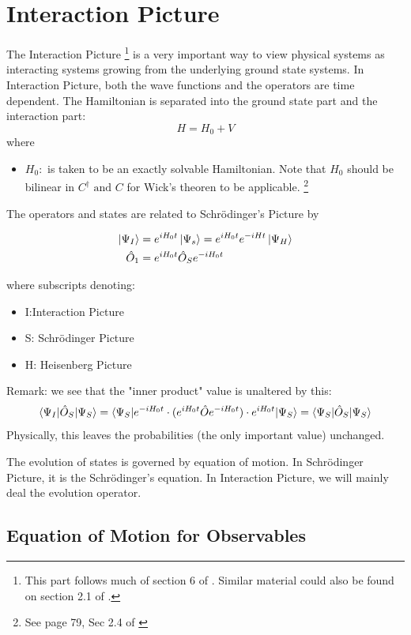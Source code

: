 \documentclass{article}
\numberwithin{equation}{subsection} %
\begin{document}
\section{Interaction Picture}

The Interaction Picture
    \footnote{This part follows much of section 6 of \cite{fetter}. Similar material could also be found on section 2.1 of \cite{mahan}.}
is a very important way to view physical systems as interacting systems growing from the underlying ground state systems. In Interaction Picture,
both the wave functions and the operators are time dependent. The Hamiltonian is separated into the ground state part and the interaction part:
	$$H=H_0+V$$
where
	\begin{itemize}
		\item 		$H_0:$
		is taken to be an exactly solvable Hamiltonian. Note that $H_0$ should be bilinear in $C^{\dagger}\text{ and } C$ for Wick's theoren to be applicable.
		\footnote{See page 79, Sec 2.4 of \cite{mahan}}
	\end{itemize}

The operators and states are related to Schrödinger's Picture by
		
\begin{align}
	\ket{\Psi_I} &=  e^{iH_0t} \ket{\Psi_s}= e^{iH_0t}e^{-iHt} \ket{ \Psi_H} \label{eq:def_Psi}  	\\
	\hat{O}_1 &= e^{iH_0t}\hat{O}_Se^{-iH_0t}
\end{align}
	
where subscripts denoting:
	\begin{itemize}
		\item 		I:Interaction Picture
		\item		S: Schrödinger Picture
		\item		H: Heisenberg Picture
	\end{itemize}
	
Remark: we see that the "inner product" value is unaltered by this:
	$$\braket{\Psi_I|\hat{O}_S|\Psi_S} 
	= \braket{\Psi_S|e^{-iH_0t} \cdot (e^{iH_0t}\Hat{O}e^{-iH_0t}) \cdot e^{iH_0t}|\Psi_S }
	=\braket{\Psi_S|\Hat{O}_S|\Psi_S}$$
Physically, this leaves the probabilities (the only important value) unchanged.

The evolution of states is governed by equation of motion. In Schrödinger Picture, it is the Schrödinger's equation. In Interaction Picture, we will mainly deal the evolution operator.

	\subsection{Equation of Motion for Observables}
	
\end{document}
